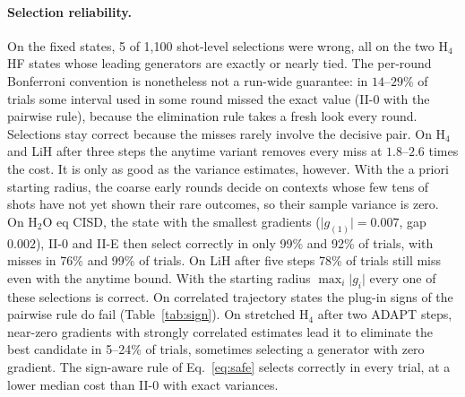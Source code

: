 \documentclass[aps,pra,reprint,superscriptaddress,nofootinbib]{revtex4-2}
\begin{document}
\paragraph{Selection reliability.} On the fixed states, 5 of 1{,}100 shot-level selections were wrong, all on the two H$_4$ HF states whose leading generators are exactly or nearly tied. The per-round Bonferroni convention is nonetheless not a run-wide guarantee: in $14$--$29\%$ of trials some interval used in some round missed the exact value (II-0 with the pairwise rule), because the elimination rule takes a fresh look every round. Selections stay correct because the misses rarely involve the decisive pair. On H$_4$ and LiH after three steps the anytime variant removes every miss at $1.8$--$2.6$ times the cost. It is only as good as the variance estimates, however. With the a priori starting radius, the coarse early rounds decide on contexts whose few tens of shots have not yet shown their rare outcomes, so their sample variance is zero. On H$_2$O eq CISD, the state with the smallest gradients ($\lvert g_{(1)}\rvert=0.007$, gap $0.002$), II-0 and II-E then select correctly in only 99\% and 92\% of trials, with misses in 76\% and 99\% of trials. On LiH after five steps 78\% of trials still miss even with the anytime bound. With the starting radius $\max_i\lvert g_i\rvert$ every one of these selections is correct. On correlated trajectory states the plug-in signs of the pairwise rule do fail (Table~\ref{tab:sign}). On stretched H$_4$ after two ADAPT steps, near-zero gradients with strongly correlated estimates lead it to eliminate the best candidate in 5--24\% of trials, sometimes selecting a generator with zero gradient. The sign-aware rule of Eq.~\eqref{eq:safe} selects correctly in every trial, at a lower median cost than II-0 with exact variances.
\end{document}
